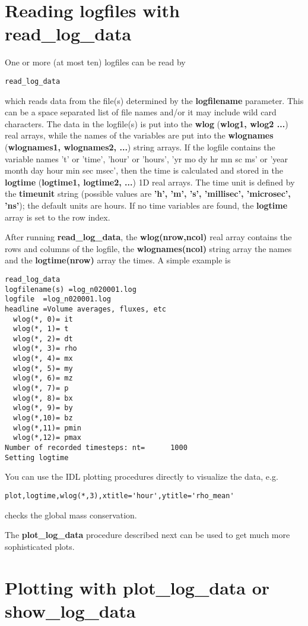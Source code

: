 \documentclass{article}
\begin{document}
\section{Reading logfiles with read\_log\_data \label{s-getlog}}

One or more (at most ten) logfiles can be read by
\begin{verbatim}
read_log_data
\end{verbatim}
which reads data from the file(s) determined by the {\bf logfilename} 
parameter. This can be a space separated list of file names and/or it
may include wild card characters. The data in the
logfile(s) is put into the {\bf wlog} ({\bf wlog1, wlog2 ...}) real arrays,
while the names of the variables are put into the {\bf wlognames} 
({\bf wlognames1, wlognames2, ...}) string arrays. If the logfile contains
the variable names 't' or 'time', 'hour' or 'hours',
'yr mo dy hr mn sc ms' or 'year month day hour min sec msec', 
then the time is calculated and stored in the {\bf logtime} 
({\bf logtime1, logtime2, ...}) 1D real arrays. 
The time unit is defined by the {\bf timeunit} string
(possible values are {\bf 'h', 'm', 's', 'millisec', 'microsec', 'ns'});
the default units are hours. 
If no time variables are found, the {\bf logtime} array is set to the
row index.

After running {\bf read\_log\_data}, the {\bf wlog(nrow,ncol)} real array 
contains the rows and columns of the logfile, 
the {\bf wlognames(ncol)} string array the names and the
{\bf logtime(nrow)} array the times. A simple example is 
\begin{verbatim}
read_log_data
logfilename(s) =log_n020001.log
logfile  =log_n020001.log
headline =Volume averages, fluxes, etc
  wlog(*, 0)= it
  wlog(*, 1)= t
  wlog(*, 2)= dt
  wlog(*, 3)= rho
  wlog(*, 4)= mx
  wlog(*, 5)= my
  wlog(*, 6)= mz
  wlog(*, 7)= p
  wlog(*, 8)= bx
  wlog(*, 9)= by
  wlog(*,10)= bz
  wlog(*,11)= pmin
  wlog(*,12)= pmax
Number of recorded timesteps: nt=      1000
Setting logtime
\end{verbatim}
You can use the IDL plotting procedures directly to visualize the data, e.g.
\begin{verbatim}
plot,logtime,wlog(*,3),xtitle='hour',ytitle='rho_mean'
\end{verbatim}
checks the global mass conservation. 

The {\bf plot\_log\_data} procedure described next can be used to get 
much more sophisticated plots. 

\section{Plotting with plot\_log\_data or show\_log\_data \label{s-plotlog}}
\end{document}
